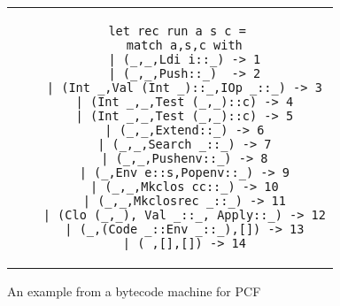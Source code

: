 

\begin{figure}%
\centering
\begin{tabular}{c} %
\begin{lstlisting}
  let rec run a s c =
    match a,s,c with
    | (_,_,Ldi i::_) -> 1
    | (_,_,Push::_)  -> 2
    | (Int _,Val (Int _)::_,IOp _::_) -> 3
    | (Int _,_,Test (_,_)::c) -> 4
    | (Int _,_,Test (_,_)::c) -> 5
    | (_,_,Extend::_) -> 6
    | (_,_,Search _::_) -> 7
    | (_,_,Pushenv::_) -> 8
    | (_,Env e::s,Popenv::_) -> 9
    | (_,_,Mkclos cc::_) -> 10
    | (_,_,Mkclosrec _::_) -> 11
    | (Clo (_,_), Val _::_, Apply::_) -> 12
    | (_,(Code _::Env _::_),[]) -> 13
    | (_,[],[]) -> 14
\end{lstlisting}
\end{tabular}
\caption{An example from a bytecode machine for PCF~\cite{Plotkin1977LCFCA,maranget2008}}
\label{fig:pcf}
\end{figure}

